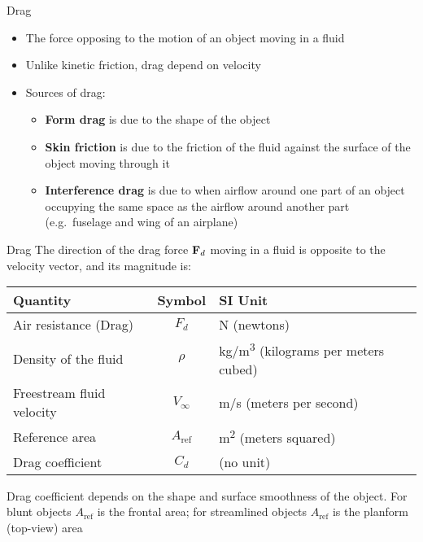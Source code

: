 \documentclass[12pt,compress,aspectratio=169]{beamer}
\newcommand{\mb}[1]{\ensuremath\mathbf{#1}}
\newcommand{\eq}[2]{\vspace{#1}{\Large\begin{displaymath}#2\end{displaymath}}}
\begin{document}
\begin{frame}{Drag}
  \begin{itemize}
  \item The force opposing to the motion of an object moving in a fluid
  \item Unlike kinetic friction, drag depend on velocity\footnotemark
  \item Sources of drag:
    \begin{itemize}
    \item\textbf{Form drag} is due to the shape of the object
    \item\textbf{Skin friction} is due to the friction of the fluid against
      the surface of the object moving through it
    \item\textbf{Interference drag} is due to when airflow around one part of
      an object occupying the same space as the airflow around another part
      (e.g.\ fuselage and wing of an airplane)
    \end{itemize}
  \end{itemize}
\end{frame}



\begin{frame}{Drag}
  The direction of the drag force $\mb{F}_d$ moving in a fluid is opposite to
  the velocity vector, and its magnitude is:

  \eq{-.2in}{
    F_d=\frac{1}{2}\rho V_\infty^2A_\mathrm{ref}C_d
  }
  
  \begin{center}
    \begin{tabular}{l|c|l}
      \rowcolor{pink}
      \textbf{Quantity} & \textbf{Symbol} & \textbf{SI Unit} \\ \hline
      Air resistance (Drag) & $F_d$  & \si{\newton} (newtons)\\
      Density of the fluid & $\rho$ & \si{\kg/\m^3}
      (kilograms per meters cubed)\\
      Freestream fluid velocity & $V_\infty$ & \si{\m/\s} (meters per second) \\
      Reference area   & $A_\mathrm{ref}$ & \si{m^2} (meters squared) \\
      Drag coefficient & $C_d$ & (no unit)
    \end{tabular}
  \end{center}
  
  {\footnotesize Drag coefficient depends on the shape and surface smoothness
    of the object. For blunt objects $A_\mathrm{ref}$ is the frontal area; for
    streamlined objects $A_\mathrm{ref}$ is the planform (top-view) area\par}
\end{frame}
\end{document}
